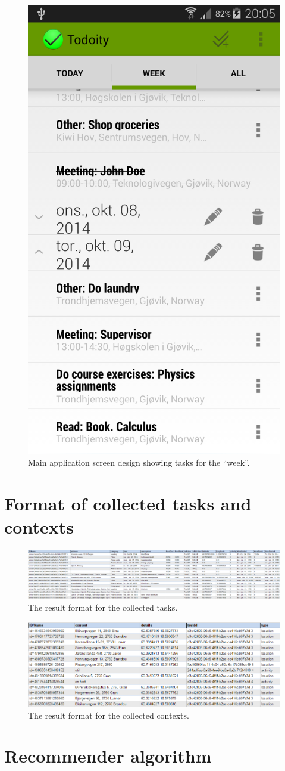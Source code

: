 \begin{figure}[h]
\centering
\includegraphics[width=0.25\columnwidth]{appendix/MainScreenWeek.PNG}
\caption{Main application screen design showing tasks for the ``week''.}
\end{figure}



\chapter{Format of collected tasks and contexts}

\begin{figure}[h]
\centering
\includegraphics[width=\columnwidth]{appendix/CollectedTasksFormat.PNG}
\caption{The result format for the collected tasks.}
\end{figure}

\begin{figure}[h]
\centering
\includegraphics[width=\columnwidth]{appendix/CollectedContextsFormat.PNG}
\caption{The result format for the collected contexts.}
\end{figure}

\chapter{Recommender algorithm}

